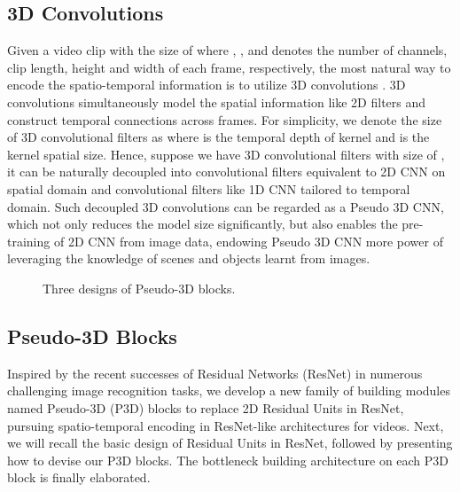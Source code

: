 \documentclass[10pt,twocolumn,letterpaper]{article}
\begin{document}
\subsection{3D Convolutions}\label{sec:3C}
Given a video clip with the size of  where , ,  and  denotes the number of channels, clip length, height and width of each frame, respectively, the most natural way to encode the spatio-temporal information is to utilize 3D convolutions \cite{Ji:PAMI13,tran2015learning}. 3D convolutions simultaneously model the spatial information like 2D filters and construct temporal connections across frames. For simplicity, we denote the size of 3D convolutional filters as  where  is the temporal depth of kernel and  is the kernel spatial size. Hence, suppose we have 3D convolutional filters with size of , it can be naturally decoupled into  convolutional filters equivalent to 2D CNN on spatial domain and  convolutional filters like 1D CNN tailored to temporal domain. Such decoupled 3D convolutions can be regarded as a Pseudo 3D CNN, which not only reduces the model size significantly, but also enables the pre-training of 2D CNN from image data, endowing Pseudo 3D CNN more power of leveraging the knowledge of scenes and objects learnt from images.

\begin{figure}[!tb]
   \centering
   \caption{\small Three designs of Pseudo-3D blocks.}
   \label{fig:fig1}
   \vspace{-0.16in}
\end{figure}

\subsection{Pseudo-3D Blocks}
Inspired by the recent successes of Residual Networks (ResNet) \cite{he2015deep} in numerous challenging image recognition tasks, we develop a new family of building modules named Pseudo-3D (P3D) blocks to replace 2D Residual Units in ResNet, pursuing spatio-temporal encoding in ResNet-like architectures for videos. Next, we will recall the basic design of Residual Units in ResNet, followed by presenting how to devise our P3D blocks. The bottleneck building architecture on each P3D block is finally elaborated.
\end{document}
